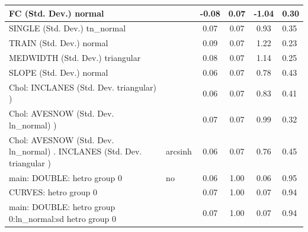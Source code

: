 \begin{table}
\begin{center}
\begin{tabular}{|l|l|c|c|c|l|}
			\hline
			FC (Std. Dev.) normal &  & -0.08 & 0.07 & -1.04 & 0.30 \\
			\hline
			SINGLE (Std. Dev.) tn_normal &  & 0.07 & 0.07 & 0.93 & 0.35 \\
			\hline
			TRAIN (Std. Dev.) normal &  & 0.09 & 0.07 & 1.22 & 0.23 \\
			\hline
			MEDWIDTH (Std. Dev.) triangular &  & 0.08 & 0.07 & 1.14 & 0.25 \\
			\hline
			SLOPE (Std. Dev.) normal &  & 0.06 & 0.07 & 0.78 & 0.43 \\
			\hline
			 Chol: INCLANES (Std. Dev. triangular) ) &  & 0.06 & 0.07 & 0.83 & 0.41 \\
			\hline
			 Chol: AVESNOW (Std. Dev. ln_normal) ) &  & 0.07 & 0.07 & 0.99 & 0.32 \\
			\hline
			 Chol: AVESNOW (Std. Dev. ln_normal) . INCLANES (Std. Dev.   triangular ) & arcsinh & 0.06 & 0.07 & 0.76 & 0.45 \\
			\hline
			main: DOUBLE: hetro group 0 & no & 0.06 & 1.00 & 0.06 & 0.95 \\
			\hline
			CURVES: hetro group 0 &  & 0.07 & 1.00 & 0.07 & 0.94 \\
			\hline
			main: DOUBLE: hetro group 0:ln_normal:sd  hetro group 0 &  & 0.07 & 1.00 & 0.07 & 0.94 \\
			\hline
		\end{tabular}
	\end{center}
\end{table}